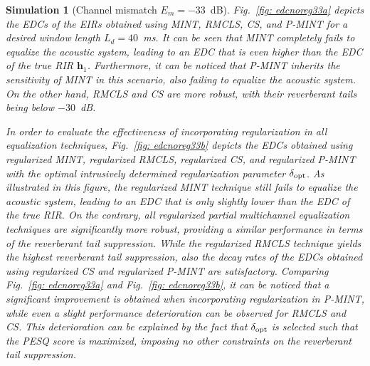 \documentclass[draftcls,onecolumn,11pt]{IEEEtran}
\newtheorem{simulation}{Simulation}
\begin{document}
\begin{simulation}[Channel mismatch $E_m=-33$~dB]
\label{sim1} 
Fig.~\ref{fig: edcnoreg33a} depicts the EDCs of the EIRs obtained using MINT, RMCLS, CS, and P-MINT for a desired window length $L_d = 40$~ms.
It can be seen that MINT completely fails to equalize the acoustic system, leading to an EDC that is even higher than the EDC of the true RIR $\mathbf{h}_1$.
Furthermore, it can be noticed that P-MINT inherits the sensitivity of MINT in this scenario, also failing to equalize the acoustic system.
On the other hand, RMCLS and CS are more robust, with their reverberant tails being below $-30$~dB.

In order to evaluate the effectiveness of incorporating regularization in all equalization techniques, Fig.~\ref{fig: edcnoreg33b} depicts the EDCs obtained using regularized MINT, regularized RMCLS, regularized CS, and regularized P-MINT with the optimal intrusively determined regularization parameter $\delta_{\rm opt}$.
As illustrated in this figure, the regularized MINT technique still fails to equalize the acoustic system, leading to an EDC that is only slightly lower than the EDC of the true RIR.
On the contrary, all regularized partial multichannel equalization techniques are significantly more robust, providing a similar performance in terms of the reverberant tail suppression.
While the regularized RMCLS technique yields the highest reverberant tail suppression, also the decay rates of the EDCs obtained using regularized CS and regularized P-MINT are satisfactory.
Comparing Fig.~\ref{fig: edcnoreg33a} and Fig.~\ref{fig: edcnoreg33b}, it can be noticed that a significant improvement is obtained when incorporating regularization in P-MINT, while even a slight performance deterioration can be observed for RMCLS and CS.
This deterioration can be explained by the fact that $\delta_{\rm opt}$ is selected such that the PESQ score is maximized, imposing no other constraints on the reverberant tail suppression.


\end{simulation}
\end{document}
